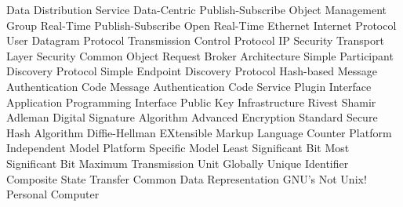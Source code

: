     {Data Distribution Service}
    {Data-Centric Publish-Subscribe}
     {Object Management Group}
    {Real-Time Publish-Subscribe}
    {Open Real-Time Ethernet}
      {Internet Protocol}
     {User Datagram Protocol}
     {Transmission Control Protocol}
   {IP Security}
     {Transport Layer Security}
   {Common Object Request Broker Architecture}
    {Simple Participant Discovery Protocol}
    {Simple Endpoint Discovery Protocol}
    {Hash-based Message Authentication Code}
     {Message Authentication Code}
     {Service Plugin Interface}
     {Application Programming Interface}
     {Public Key Infrastructure}
     {Rivest Shamir Adleman}
     {Digital Signature Algorithm}
     {Advanced Encryption Standard}
     {Secure Hash Algorithm}
      {Diffie-Hellman}
     {EXtensible Markup Language}
     {Counter}
     {Platform Independent Model}
     {Platform Specific Model}
     {Least Significant Bit}
     {Most Significant Bit}
     {Maximum Transmission Unit}
    {Globally Unique Identifier}
     {Composite State Transfer}
     {Common Data Representation}
     {GNU's Not Unix!}
      {Personal Computer}
